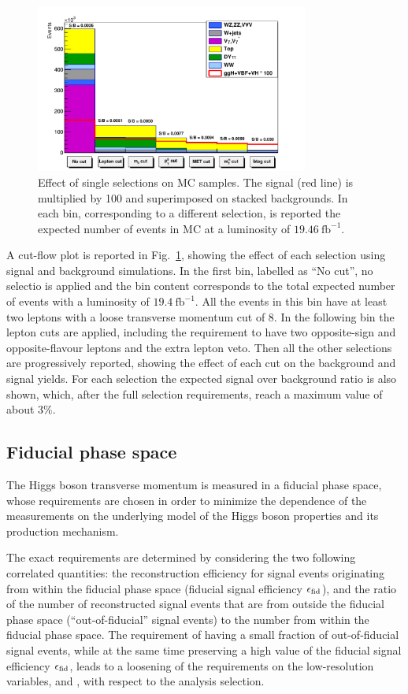 \begin{figure}[b]
\centering
\includegraphics[width=0.8\textwidth]{images/cutflow2.pdf}
\caption{Effect of single selections on MC samples. The signal (red line) is multiplied by 100 and superimposed on stacked backgrounds. In each bin, corresponding to a different selection, is reported the expected number of events in MC at a luminosity of $19.46~\mathrm{fb}^{-1}$.}\label{fig:cutflow}
\end{figure}

A  cut-flow plot is reported in Fig.~\ref{fig:cutflow}, showing the effect of each selection using signal and background simulations. In the first bin, labelled as ``No cut'', no selectio is applied and the bin content corresponds to the total expected number of events with a luminosity of $19.4~\mathrm{fb}^{-1}$. All the events in this bin have at least two leptons with a loose transverse momentum cut of 8\GeV. In the following bin the lepton cuts are applied, including the requirement to have two opposite-sign and opposite-flavour leptons and the extra lepton veto. Then all the other selections are progressively reported, showing the effect of each cut on the background and signal yields. For each selection the expected signal over background ratio is also shown, which, after the full selection requirements, reach a maximum value of about $3\%$.

\subsection{Fiducial phase space}
The Higgs boson transverse momentum is measured in a fiducial phase space, whose requirements are chosen in order to minimize the dependence of the measurements on the underlying model of the Higgs boson properties and its production mechanism.

The exact requirements are determined by considering the two following correlated quantities: the reconstruction efficiency for signal events originating from within the fiducial phase space (fiducial signal efficiency $\epsilon_{\rm{fid}}$), and the ratio of the number of reconstructed signal events that are from outside the fiducial phase space (``out-of-fiducial'' signal events) to the number from within the fiducial phase space. The requirement of having a small fraction of out-of-fiducial signal events, while at the same time preserving a high value of the fiducial signal efficiency $\epsilon_{\rm{fid}}$, leads to a loosening of the requirements on the low-resolution variables,  \MET and \mt, with respect to the analysis selection.

